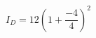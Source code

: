 \documentclass[preview]{standalone}
\begin{document}
\begin{align*}
I_D = 12 ( 1+\dfrac{-4}{4} )^2
\end{align*}
\end{document}
